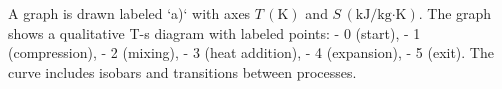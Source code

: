 A graph is drawn labeled `a)` with axes \( T \, (\text{K}) \) and \( S \, (\text{kJ/kg·K}) \). The graph shows a qualitative T-s diagram with labeled points:  
- 0 (start),  
- 1 (compression),  
- 2 (mixing),  
- 3 (heat addition),  
- 4 (expansion),  
- 5 (exit).  
The curve includes isobars and transitions between processes.